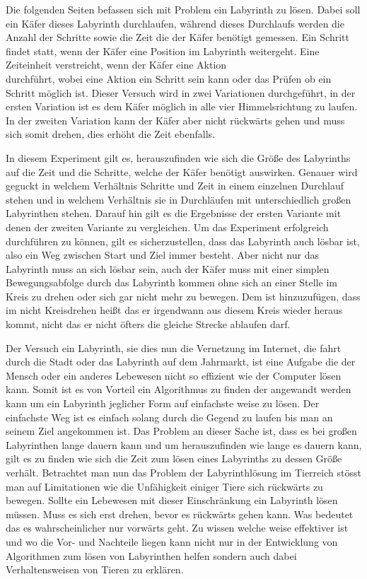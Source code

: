 \documentclass[12pt, a4paper, titlepage]{article}
\begin{document}
Die folgenden Seiten befassen sich mit Problem ein Labyrinth zu lösen.
Dabei soll ein Käfer dieses Labyrinth durchlaufen, während dieses Durchlaufs werden die Anzahl der Schritte sowie die Zeit die der Käfer benötigt gemessen.
Ein Schritt findet statt, wenn der Käfer eine Position im Labyrinth weitergeht.
Eine Zeiteinheit verstreicht, wenn der Käfer eine Aktion \\ durchführt, wobei eine Aktion ein Schritt sein kann oder das Prüfen ob ein Schritt möglich ist.
Dieser Versuch wird in zwei Variationen durchgeführt, in der ersten Variation ist es dem Käfer möglich in alle vier Himmelsrichtung zu laufen.
In der zweiten Variation kann der Käfer aber nicht rückwärts gehen und muss sich somit drehen, dies erhöht die Zeit ebenfalls.

\bigskip

In diesem Experiment gilt es, herauszufinden wie sich die Größe des Labyrinths auf die Zeit und die Schritte, welche der Käfer benötigt auswirken.
Genauer wird geguckt in welchem Verhältnis Schritte und Zeit in einem einzelnen Durchlauf stehen und in welchem Verhältnis sie in Durchläufen mit unterschiedlich großen Labyrinthen stehen.
Darauf hin gilt es die Ergebnisse der ersten Variante mit denen der zweiten Variante zu vergleichen.
Um das Experiment erfolgreich durchführen zu können, gilt es sicherzustellen, dass das Labyrinth auch lösbar ist, also ein Weg zwischen Start und Ziel immer besteht.
Aber nicht nur das Labyrinth muss an sich lösbar sein, auch der Käfer muss mit einer simplen Bewegungsabfolge durch das Labyrinth kommen ohne sich an einer Stelle im Kreis zu drehen oder sich gar nicht mehr zu bewegen.
Dem ist hinzuzufügen, dass im nicht Kreisdrehen heißt das er irgendwann aus diesem Kreis wieder heraus kommt, nicht das er nicht öfters die gleiche Strecke ablaufen darf.

\bigskip

Der Versuch ein Labyrinth, sie dies nun die Vernetzung im Internet, die fahrt durch die Stadt oder das Labyrinth auf dem Jahrmarkt, ist eine Aufgabe die der Mensch oder ein anderes Lebewesen nicht so effizient wie der Computer lösen kann.
Somit ist es von Vorteil ein Algorithmus zu finden der angewandt werden kann um ein Labyrinth jeglicher Form auf einfachste weise zu lösen. 
Der einfachste Weg ist es einfach solang durch die Gegend zu laufen bis man an seinem Ziel angekommen ist.
Das Problem an dieser Sache ist, dass es bei großen Labyrinthen lange dauern kann und um herauszufinden wie lange es dauern kann, gilt es zu finden wie sich die Zeit zum lösen eines Labyrinths zu dessen Größe verhält.
Betrachtet man nun das Problem der Labyrinthlösung im Tierreich stösst man auf Limitationen wie die Unfähigkeit einiger Tiere sich rückwärts zu bewegen. Sollte ein Lebewesen mit dieser Einschränkung ein Labyrinth lösen müssen. Muss es sich erst drehen, bevor es rückwärts gehen kann. Was bedeutet das es wahrscheinlicher nur vorwärts geht. Zu wissen welche weise effektiver ist und wo die Vor- und Nachteile liegen kann nicht nur in der Entwicklung von Algorithmen zum lösen von Labyrinthen helfen sondern auch dabei Verhaltensweisen von Tieren zu erklären.
\end{document}
